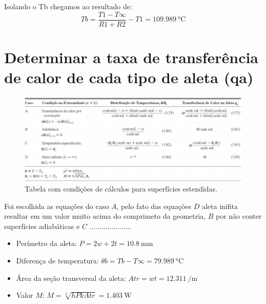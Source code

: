 Isolando o Tb chegamos ao resultado de:
\begin{equation}
    {Tb}={\frac{T1 -T\infty}{{R1}+{R2}}}-{T1} = \SI{109,989}{\degreeCelsius}
\end{equation}

\clearpage

\section{Determinar a taxa de transferência de calor de cada tipo de aleta (qa)}\label{sec:calcTable}

\begin{figure}[h]
    \centering
    \caption{Tabela com condições de cálculos para superfícies estendidas.}
    \label{fig:tabelaCasosCalc}
    \includegraphics[width=15cm]{figuras/tabelaCasosCalc.jpg}
    \fonteproprioautor
\end{figure}

Foi escolhida as equações do caso \(A\), pelo fato das equações
\(D\) aleta inifita resultar em um valor muito acima do comprimeto da
geometria,
\(B\) por não conter superfícies adiabáticas
e \(C\) .....................

\begin{itemize}[leftmargin=2cm]
    \item Perímetro da aleta: \(
        {P}={2w+2t} = \SI{10,8}{\milli\meter}
    \)
    \item Diferença de temperatura: \(
        {\theta}b={{Tb}-{T\infty}} = \SI{79,989}{\degreeCelsius}
    \)
    \item Área da seção transversal da aleta: \(
        {Atr}={{w}{t}} = \SI{12,311}{\per\meter}
    \)
    \item Valor \(M\): \(
        {M}={\sqrt[2]{{h}{P}{k}{Atr}}} = \SI{1,403}{\watt}
    \)
\end{itemize}
